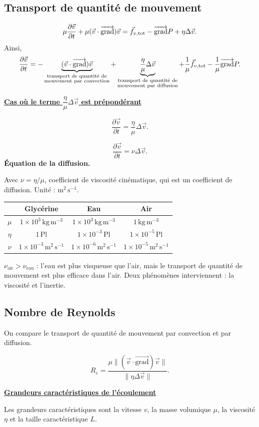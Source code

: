 \documentclass[11pt,a4paper]{article}
\newcommand{\grad}{\overrightarrow{\mathrm{grad}}}
\newcommand{\pd}[2]{\frac{\partial #1}{\partial #2}}
\newcommand{\titr}[1]{\par\textbf{\underline{#1}}\par\nopagebreak[3]}
\newcommand{\etoiles}[1]{\foreach \i in {1,...,#1}{\mathord{\star}\,}}
\newcommand{\conv}{(\vec v\cdot\grad)\vec v}
\newcommand{\Rey}{R_e}
\begin{document}
\subsection{Transport de quantité de mouvement}
\[\mu\pd{\vec v}{t}+\mu\conv=\fvt-\grad P+\eta\Delta\vec v.\]
Ainsi,
\[\pd{\vec v}{t}=-\underbrace{\conv}_{\substack{\text{transport de quantité de}\\\text{mouvement par convection}}}+\underbrace{\frac\eta\mu\Delta\vec v}_{\substack{\text{transport de quantité de}\\\text{mouvement par diffusion}}}+\frac1\mu\fvt-\frac1\mu\grad P.\]
\titr{Cas où le terme $\dfrac\eta\mu\Delta\vec v$ est prépondérant}
\[\pd{\vec v}{t}=\frac\eta\mu\Delta\vec v.\]
\begin{cadre}[etoiles={\etoiles{4}}]\[\pd{\vec v}{t}=\nu\Delta\vec v.\]\textbf{Équation de la diffusion.}\end{cadre}
Avec $\nu=\eta/\mu$, coefficient de viscosité cinématique, qui est un coefficient de diffusion. Unité : $\mathrm{m^2\,s^{-1}}$.
\begin{center}\renewcommand{\arraystretch}{1.55}\begin{tabular}{c|c|c|c}
& Glycérine & Eau & Air\\\hline
$\mu$ & $1\times10^3\,\mathrm{kg\,m^{-3}}$ & $1\times10^3\,\mathrm{kg\,m^{-3}}$ & $1\,\mathrm{kg\,m^{-3}}$\\
$\eta$ & $1\,\mathrm{Pl}$ & $1\times10^{-3}\,\mathrm{Pl}$ & $1\times10^{-5}\,\mathrm{Pl}$\\
$\nu$ & $1\times10^{-3}\,\mathrm{m^2\,s^{-1}}$ & $1\times10^{-6}\,\mathrm{m^2\,s^{-1}}$ & $1\times10^{-5}\,\mathrm{m^2\,s^{-1}}$
\end{tabular}\end{center}
$\nu_{\mathrm{air}}>\nu_{\mathrm{eau}}$ : l'eau est plus visqueuse que l'air, mais le transport de quantité de mouvement est plus efficace dans l'air. Deux phénomènes interviennent : la viscosité et l'inertie.

\subsection{Nombre de Reynolds}
On compare le transport de quantité de mouvement par convection et par diffusion.
\begin{cadre}\[\Rey=\frac{\mu\bigl\|\conv\bigr\|}{\bigl\|\eta\Delta\vec v\bigr\|}.\]\end{cadre}
\titr{Grandeurs caractéristiques de l'écoulement}
\begin{center}\end{center}
Les grandeurs caractéristiques sont la vitesse $v$, la masse volumique $\mu$, la viscosité $\eta$ et la taille caractéristique $L$.
\end{document}
